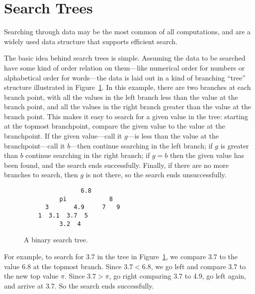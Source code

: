 \newcommand{\bintree}{\text{BT}}
\newcommand{\rectree}{\text{RT}}
\newcommand{\ubt}{\text{UT}}
\newcommand{\leafset}{\text{Leaves}}
\newcommand{\leafp}[1]{\text{leaf?}(#1)}
\newcommand{\rightsub}[1]{\text{rt}(#1)}
\newcommand{\leftsub}[1]{\text{lf}(#1)}
\newcommand{\subtrees}[1]{\text{subtr}(#1)}

\section{Search Trees}

Searching through data may be the most common of all computations, and
 are a widely used data structure that supports
efficient search.

The basic idea behind search trees is simple.  Assuming the data to be
searched have some kind of order relation on them---like numerical order
for numbers or alphabetical order for words---the data is laid out in
a kind of branching ``tree'' structure illustrated in
Figure~\ref{searchtree1}.  In this example, there are two branches at
each branch point, with all the values in the left branch less than
the value at the branch point, and all the values in the right branch
greater than the value at the branch point.  This makes it easy to
search for a given value in the tree: starting at the topmost
branchpoint, compare the given value to the value at the branchpoint.
If the given value---call it $g$---is less than the value at the
branchpoint---call it $b$---then continue searching in the left
branch; if $g$ is greater than $b$ continue searching in the right
branch; if $g = b$ then the given value has been found, and the search
ends successfully.  Finally, if there are no more branches to search,
then $g$ is not there, so the search ends unsuccessfully.

\begin{figure}


\begin{verbatim}
                6.8
          pi            8  
      3       4.9     7   9 
    1  3.1  3.7  5
          3.2  4 
\end{verbatim}

\caption{A binary search tree.}

\label{searchtree1}

\end{figure}

For example, to search for 3.7 in the tree in Figure~\ref{searchtree1},
we compare 3.7 to the value 6.8 at the topmost branch.  Since $3.7 <
6.8$, we go left and compare $3.7$ to the new top value $\pi$.  Since
$3.7 > \pi$, go right comparing 3.7 to 4.9, go left again, and arrive
at 3.7. So the search ends successfully.

